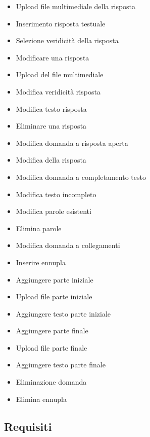 \begin{itemize}
	\item {} Upload file multimediale della risposta
	\item {} Inserimento risposta testuale
	\item {} Selezione veridicità della risposta
	\item {} Modificare una risposta
	\item {} Upload del file multimediale
	\item {} Modifica veridicità risposta
	\item {} Modifica testo risposta
	\item {} Eliminare una risposta
	\item {} Modifica domanda a risposta aperta 
	\item {} Modifica della risposta 
	\item {} Modifica domanda a completamento testo 
	\item {} Modifica testo incompleto
	\item {} Modifica parole esistenti
	\item {} Elimina parole
	\item {} Modifica domanda a collegamenti
	\item {} Inserire ennupla
	\item {} Aggiungere parte iniziale
	\item {} Upload file parte iniziale 
	\item {} Aggiungere testo parte iniziale
	\item {} Aggiungere parte finale 
	\item {} Upload file parte finale
	\item {} Aggiungere testo parte finale
	\item {} Eliminazione domanda
	\item {} Elimina ennupla
\end{itemize}

\subsection{Requisiti}
